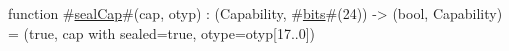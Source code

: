 function #\hyperref[sailMIPSzsealCap]{sealCap}#(cap, otyp) : (Capability, #\hyperref[sailMIPSzbits]{bits}#(24)) -> (bool, Capability) =
    (true, {cap with sealed=true, otype=otyp[17..0]})
